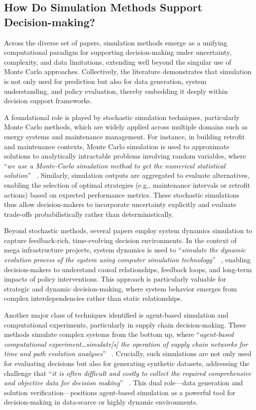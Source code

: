 \documentclass{sfuthesis}
\begin{document}
\subsection{How Do Simulation Methods Support Decision-making?}
Across the diverse set of papers, simulation methods emerge as a unifying computational paradigm for supporting decision-making under uncertainty, complexity, and data limitations, extending well beyond the singular use of Monte Carlo approaches. Collectively, the literature demonstrates that simulation is not only used for prediction but also for data generation, system understanding, and policy evaluation, thereby embedding it deeply within decision support frameworks.\par
A foundational role is played by stochastic simulation techniques, particularly Monte Carlo methods, which are widely applied across multiple domains such as energy systems and maintenance management. For instance, in building retrofit and maintenance contexts, Monte Carlo simulation is used to approximate solutions to analytically intractable problems involving random variables, where “\textit{we use a Monte-Carlo simulation method to get the numerical statistical solution}” ~\cite{Ma2020EquipmentMaintenance}. Similarly, simulation outputs are aggregated to evaluate alternatives, enabling the selection of optimal strategies (e.g., maintenance intervals or retrofit actions) based on expected performance metrics. These stochastic simulations thus allow decision-makers to incorporate uncertainty explicitly and evaluate trade-offs probabilistically rather than deterministically.\par
 Beyond stochastic methods, several papers employ system dynamics simulation to capture feedback-rich, time-evolving decision environments. In the context of mega infrastructure projects, system dynamics is used to “\textit{simulate the dynamic evolution process of the system using computer simulation technology}” ~\cite{Hu2023MegaInfrastructure}, enabling decision-makers to understand causal relationships, feedback loops, and long-term impacts of policy interventions. This approach is particularly valuable for strategic and dynamic decision-making, where system behavior emerges from complex interdependencies rather than static relationships.\par
Another major class of techniques identified is agent-based simulation and computational experiments, particularly in supply chain decision-making. These methods simulate complex systems from the bottom up, where “\textit{agent-based computational experiment…simulate[s] the operation of supply chain networks for time and path evolution analyses}” ~\cite{long2018data}. Crucially, such simulations are not only used for evaluating decisions but also for generating synthetic datasets, addressing the challenge that “\textit{it is often difficult and costly to collect the required comprehensive and objective data for decision making}” ~\cite{long2018data}. This dual role—data generation and solution verification—positions agent-based simulation as a powerful tool for decision-making in data-scarce or highly dynamic environments.\par
\end{document}
